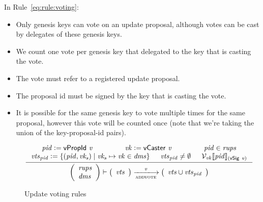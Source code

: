 In Rule~\ref{eq:rule:voting}:
\begin{itemize}
\item Only genesis keys can vote on an update proposal, although votes can be
  cast by delegates of these genesis keys.
\item We count one vote per genesis key that delegated to the key that is
  casting the vote.
\item The vote must refer to a registered update proposal.
\item The proposal id must be signed by the key that is casting the vote.
\item It is possible for the same genesis key to vote multiple times for
  the same proposal, however this vote will be counted once (note that we're
  taking the union of the key-proposal-id pairs).
\end{itemize}

\begin{figure}[htb]
  \begin{equation}
    \label{eq:rule:voting}
    \inference
    {
      \var{pid} \leteq \vPropId{v} & \var{vk} \leteq \vCaster{v} & \var{pid} \in \var{rups}\\
      \var{vts}_{\var{pid}} \leteq
      \{ (\var{pid}, \var{vk_s}) \mid \var{vk_s} \mapsto \var{vk} \in \var{dms} \} &
      \var{vts}_{\var{pid}} \neq \emptyset &
      \mathcal{V}_{\var{vk}}\serialised{\var{pid}}_{(\vSig{v})}\\
    }
    {
      {\left(
        \begin{array}{l}
          \var{rups}\\
          \var{dms}
        \end{array}
      \right)}
      \vdash
      {
        \left(
          \begin{array}{l}
            \var{vts}
          \end{array}
        \right)
      }
      \trans{addvote}{\var{v}}
      {
        \left(
          \begin{array}{l}
            \var{vts} \cup \var{vts}_{\var{pid}}\\
          \end{array}
        \right)
      }
    }
  \end{equation}
  \caption{Update voting rules}
  \label{fig:rules:voting}
\end{figure}

\clearpage

